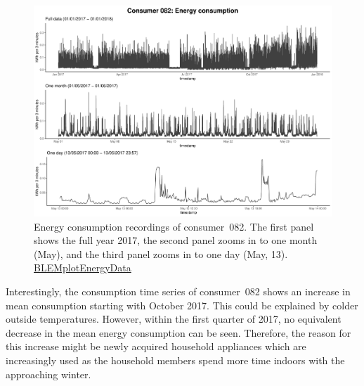 \begin{figure}[ht]
 \centering
\includegraphics[width=\textwidth]{thesis/graphs/timeseries/c082_cons.pdf}
\caption[Energy consumption recordings of consumer~082]{Energy consumption recordings of consumer~082. The first panel shows the full year 2017, the second panel zooms in to one month (May), and the third panel zooms in to one day (May, 13). \quantnet\href{https://github.com/QuantLet/BLEM/tree/master/BLEMplotEnergyData}{BLEMplotEnergyData}}
\label{Fig:energycons_c082}
\end{figure}

\newpage
Interestingly, the consumption time series of consumer~082 shows an increase in mean consumption starting with October 2017. This could be explained by colder outside temperatures. However, within the first quarter of 2017, no equivalent decrease in the mean energy consumption can be seen. Therefore, the reason for this increase might be newly acquired household appliances which are increasingly used as the household members spend more time indoors with the approaching winter.

